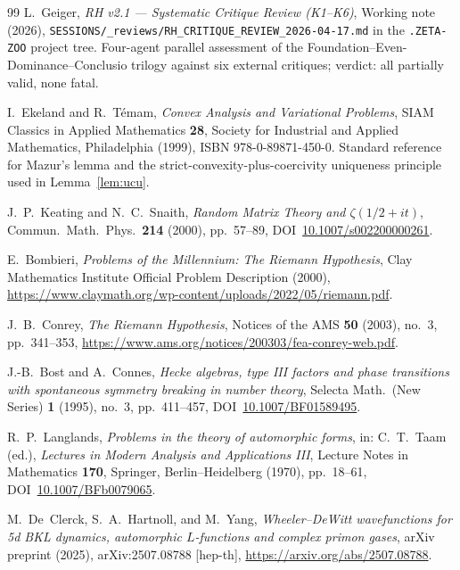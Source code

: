\documentclass[11pt]{article}
\theoremstyle{definition}
\theoremstyle{remark}
\begin{document}
\begin{thebibliography}{99}
L.~Geiger, \emph{RH v2.1 --- Systematic Critique Review (K1--K6)},
Working note (2026), \texttt{SESSIONS/\_reviews/RH\_CRITIQUE\_REVIEW\_2026-04-17.md}
in the \texttt{.ZETA-ZOO} project tree.
Four-agent parallel assessment of the Foundation--Even-Dominance--Conclusio
trilogy against six external critiques; verdict: all partially valid,
none fatal.

I.~Ekeland and R.~T\'emam, \emph{Convex Analysis and Variational
Problems}, SIAM Classics in Applied Mathematics \textbf{28}, Society
for Industrial and Applied Mathematics, Philadelphia (1999),
ISBN 978-0-89871-450-0. Standard reference for Mazur's lemma and
the strict-convexity-plus-coercivity uniqueness principle used in
Lemma~\ref{lem:ucu}.


J.~P.~Keating and N.~C.~Snaith, \emph{Random Matrix Theory and
$\zeta(1/2 + it)$}, Commun.\ Math.\ Phys.\ \textbf{214} (2000),
pp.~57--89, DOI~\href{https://doi.org/10.1007/s002200000261}{10.1007/s002200000261}.

E.~Bombieri, \emph{Problems of the Millennium: The Riemann
Hypothesis}, Clay Mathematics Institute Official Problem
Description (2000),
\url{https://www.claymath.org/wp-content/uploads/2022/05/riemann.pdf}.

J.~B.~Conrey, \emph{The Riemann Hypothesis}, Notices of the AMS
\textbf{50} (2003), no.~3, pp.~341--353,
\url{https://www.ams.org/notices/200303/fea-conrey-web.pdf}.

J.-B.~Bost and A.~Connes, \emph{Hecke algebras, type III factors
and phase transitions with spontaneous symmetry breaking in number
theory}, Selecta Math.\ (New Series) \textbf{1} (1995), no.~3,
pp.~411--457,
DOI~\href{https://doi.org/10.1007/BF01589495}{10.1007/BF01589495}.

R.~P.~Langlands, \emph{Problems in the theory of automorphic
forms}, in: C.~T.~Taam (ed.), \emph{Lectures in Modern Analysis
and Applications III}, Lecture Notes in Mathematics \textbf{170},
Springer, Berlin--Heidelberg (1970), pp.~18--61,
DOI~\href{https://doi.org/10.1007/BFb0079065}{10.1007/BFb0079065}.

M.~De~Clerck, S.~A.~Hartnoll, and M.~Yang,
\emph{Wheeler--DeWitt wavefunctions for 5d BKL dynamics, automorphic
$L$-functions and complex primon gases}, arXiv preprint (2025),
arXiv:2507.08788 [hep-th],
\url{https://arxiv.org/abs/2507.08788}.


\end{thebibliography}
\end{document}
